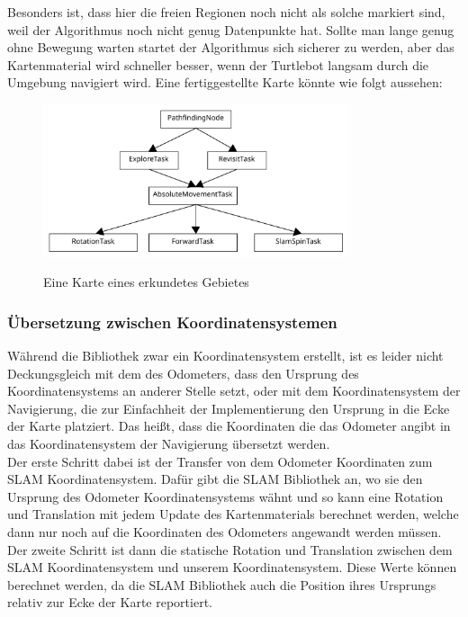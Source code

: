 Besonders ist, dass hier die freien Regionen noch nicht als solche markiert sind, weil der Algorithmus noch nicht genug
Datenpunkte hat.
Sollte man lange genug ohne Bewegung warten startet der Algorithmus sich sicherer zu werden, aber das Kartenmaterial
wird schneller besser, wenn der Turtlebot langsam durch die Umgebung navigiert wird.
Eine fertiggestellte Karte könnte wie folgt aussehen:

\begin{figure}[h!]
    \caption{Eine Karte eines erkundetes Gebietes} %
\includegraphics[width=0.8\textwidth]{img/TaskDiagram}\label{fig:map_finished}
\centering
\end{figure}

\subsubsection{Übersetzung zwischen Koordinatensystemen}
Während die Bibliothek zwar ein Koordinatensystem erstellt, ist es leider nicht Deckungsgleich mit dem des Odometers,
dass den Ursprung des Koordinatensystems an anderer Stelle setzt, oder mit dem Koordinatensystem der Navigierung, die zur
Einfachheit der Implementierung den Ursprung in die Ecke der Karte platziert.
Das heißt, dass die Koordinaten die das Odometer angibt in das Koordinatensystem der Navigierung übersetzt werden. \\

Der erste Schritt dabei ist der Transfer von dem Odometer Koordinaten zum SLAM Koordinatensystem.
Dafür gibt die SLAM Bibliothek an, wo sie den Ursprung des Odometer Koordinatensystems wähnt und so kann eine Rotation
und Translation mit jedem Update des Kartenmaterials berechnet werden, welche dann nur noch auf die Koordinaten des
Odometers angewandt werden müssen.
Der zweite Schritt ist dann die statische Rotation und Translation zwischen dem SLAM Koordinatensystem und unserem
Koordinatensystem.
Diese Werte können berechnet werden, da die SLAM Bibliothek auch die Position ihres Ursprungs relativ zur Ecke der Karte
reportiert.\\


